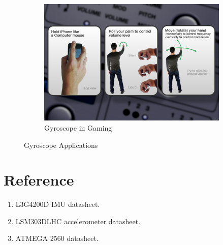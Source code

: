 \documentclass[a4paper,12 pt]{article}
\begin{document}
\begin{figure}[!h]
\begin{subfigure}[b]{0.3\textwidth}
                \includegraphics[width=\textwidth]{gyr6.jpg}
                \caption{Gyroscope in Gaming}
                \label{fig:mouse}
        \end{subfigure}
        \caption{Gyroscope Applications}\label{fig:animal}
\end{figure}

\newpage
\section{Reference}
\begin{enumerate}
\item L3G4200D IMU datasheet.
\item LSM303DLHC accelerometer datasheet.
\item ATMEGA 2560 datasheet.
\end{enumerate}
\end{document}

